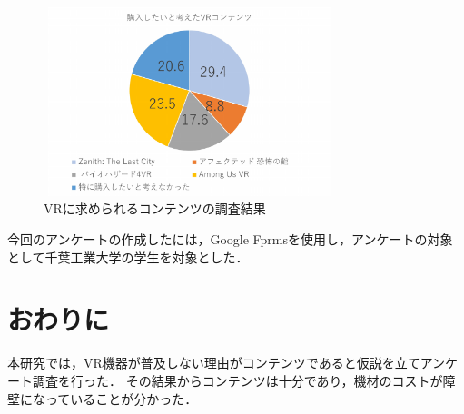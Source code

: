 \documentclass[twocolumn,10pt,a4j]{ltjsarticle}
\begin{document}
\begin{figure}[h]
\begin{center}
 \includegraphics[clip,width=85mm,height=55mm]{購入したいと考えたvrコンテンツ.pdf}
\end{center}
 \caption{VRに求められるコンテンツの調査結果}
 \label{fig:購入したいと考えたvrコンテンツ.pdf}
\end{figure}

今回のアンケートの作成したには，Google Fprmsを使用し，アンケートの対象として千葉工業大学の学生を対象とした．

\section{おわりに}
本研究では，VR機器が普及しない理由がコンテンツであると仮説を立てアンケート調査を行った．
その結果からコンテンツは十分であり，機材のコストが障壁になっていることが分かった．

\end{document}
